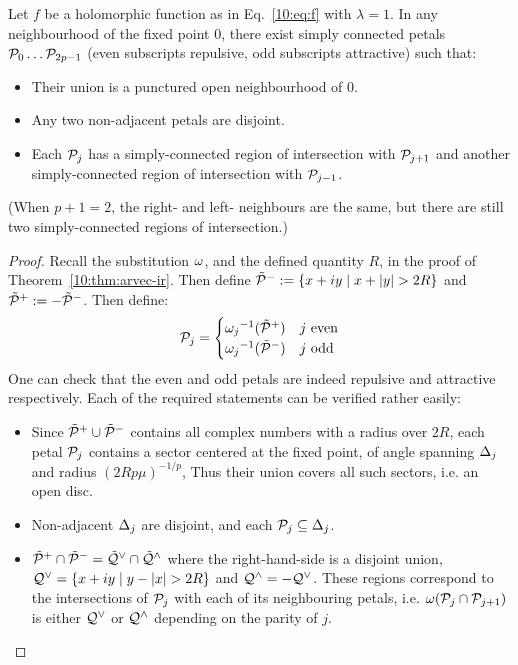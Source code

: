 \documentclass[../main.tex]{subfiles}
\begin{document}
\begin{thm}
    \label{10:thm:flower}
    Let $f$ be a holomorphic function as in Eq.~\ref{10:eq:f} with $\lambda = 1$. In any neighbourhood of the fixed point 0, there exist simply connected petals $\mathcal{P}_{0}\dots\mathcal{P}_{2p-1}$ (even subscripts repulsive, odd subscripts attractive) such that:
    \begin{itemize}
        \item Their union is a punctured open neighbourhood of 0.
        \item Any two non-adjacent petals are disjoint.
        \item Each $\mathcal{P}_j$ has a simply-connected region of intersection with $\mathcal{P}_{j+1}$ and another simply-connected region of intersection with $\mathcal{P}_{j-1}$.
    \end{itemize}
\end{thm}
(When $p + 1 = 2$, the right- and left- neighbours are the same, but there are still two simply-connected regions of intersection.)
\begin{proof}
    Recall the substitution $\omega$, and the defined quantity $R$, in the proof of Theorem~\ref{10:thm:arvec-ir}. Then define $\Tr{\petal}^-:=\{x+iy\mid x+\abs{y}>2R\}$ and $\tilde{\mathcal{P}}^+:=-\tilde{\mathcal{P}}^-$. Then define:
    \begin{equation*}
        \mathcal{P}_j=
        \begin{cases} 
            {\omega_j}^{-1}(\tilde{\mathcal{P}}^+) & j\,\,\mathrm{even} \\
            {\omega_j}^{-1}(\tilde{\mathcal{P}}^-) & j\,\,\mathrm{odd}
        \end{cases}
    \end{equation*}
    One can check that the even and odd petals are indeed repulsive and attractive respectively. Each of the required statements can be verified rather easily:
    \begin{itemize}
        \item Since $\tilde{\mathcal{P}}^+\cup\tilde{\mathcal{P}}^-$ contains all complex numbers with a radius over $2R$, each petal $\mathcal{P}_j$ contains a sector centered at the fixed point, of angle spanning $\Delta_j$ and radius $(2Rp\mu)^{-1/p}$, Thus their union covers all such sectors, i.e. an open disc. 
        \item Non-adjacent $\Delta_j$ are disjoint, and each $\mathcal{P}_j\subseteq\Delta_j$. 
        \item $\tilde{\mathcal{P}}^+\cap\tilde{\mathcal{P}}^-=\tilde{\mathcal{Q}}^\vee\cap\tilde{\mathcal{Q}}^\wedge$ where the right-hand-side is a disjoint union, $\mathcal{Q}^\vee = \{x+iy\mid y - \left|x\right| > 2R\}$ and $\mathcal{Q}^\wedge=-\mathcal{Q}^\vee$. These regions correspond to the intersections of $\mathcal{P}_j$ with each of its neighbouring petals, i.e. $\omega(\mathcal{P}_j\cap\mathcal{P}_{j+1})$ is either $\mathcal{Q}^\vee$ or $\mathcal{Q}^\wedge$ depending on the parity of $j$.
    \end{itemize}
\end{proof}
\end{document}
